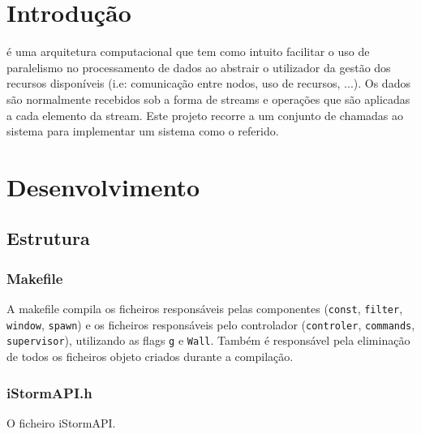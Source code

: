 \documentclass[12pt]{article}
\begin{document}
\section{Introdução}
 é uma arquitetura computacional que tem como intuito facilitar o uso de paralelismo no processamento de dados ao abstrair o utilizador da gestão dos recursos disponíveis (i.e: comunicação entre nodos, uso de recursos, ...). Os dados são normalmente recebidos sob a forma de streams e operações que são aplicadas a cada elemento da stream. Este projeto recorre a um conjunto de chamadas ao sistema para implementar um sistema como o referido.


\newpage


\section{Desenvolvimento} 

\subsection{Estrutura}
\subsubsection{Makefile}
A makefile compila os ficheiros responsáveis pelas componentes (\texttt{const},  \texttt{filter}, \texttt{window}, \texttt{spawn}) e os ficheiros responsáveis pelo controlador (\texttt{controler}, \texttt{commands}, \texttt{supervisor}), utilizando as flags \texttt{g} e \texttt{Wall}. Também é responsável pela eliminação de todos os ficheiros objeto criados durante a compilação.

\subsubsection{iStormAPI.h}
O ficheiro iStormAPI.
\end{document}
